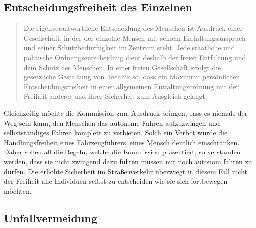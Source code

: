 \documentclass[twoside,a4paper,12pt]{article}
\begin{document}
\subsection{Entscheidungsfreiheit des Einzelnen} \label{EntscheidungsfreiheitDesEinzelnen}

\begin{quote}
\glqq
Die eigenverantwortliche Entscheidung des Menschen ist Ausdruck einer Gesellschaft, in
der der einzelne Mensch mit seinem Entfaltungsanspruch und seiner Schutzbedürftigkeit
im Zentrum steht. Jede staatliche und politische Ordnungsentscheidung dient deshalb
der freien Entfaltung und dem Schutz des Menschen. In einer freien Gesellschaft erfolgt
die gesetzliche Gestaltung von Technik so, dass ein Maximum persönlicher Entscheidungsfreiheit in einer allgemeinen 
Entfaltungsordnung mit der Freiheit anderer und ihrer
Sicherheit zum Ausgleich gelangt.\grqq\mbox{~\cite[S. 10]{ek}}
\end{quote}
Gleichzeitig möchte die Kommission zum Ausdruck bringen, dass es niemals der Weg sein kann, den Menschen das autonome Fahren aufzuzwingen und  selbstständiges Fahren komplett zu verbieten. Solch ein Verbot würde die Handlungsfreiheit eines Fahrzeugführers, eines Mensch deutlich einschränken. Daher sollen all die Regeln, welche die Kommission präsentiert, so verstanden werden, dass sie nicht zwingend dazu führen müssen nur noch autonom fahren zu dürfen. Die erhöhte Sicherheit im Straßenverkehr überwiegt in diesem Fall nicht der Freiheit alle Individuen selbst zu entscheiden wie sie sich fortbewegen möchten.
\\

\subsection{Unfallvermeidung} \label{Unfallvermeidung}
\end{document}
